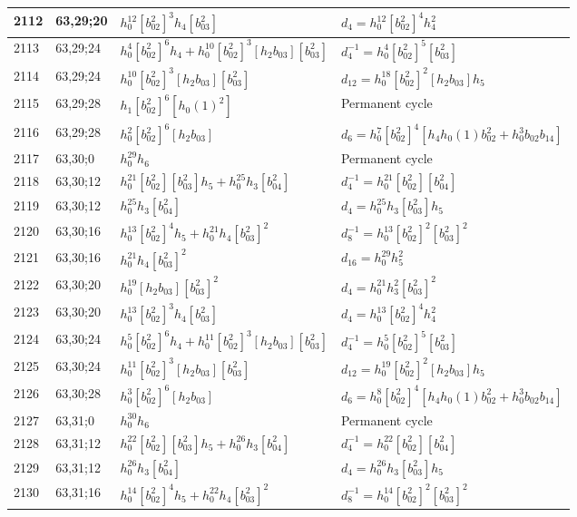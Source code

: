\documentclass{article}
\begin{document}
\begin{longtable}{|l|l|>{\raggedright\arraybackslash}p{6cm}|>{\raggedright\arraybackslash}p{6cm}|}
2112 & 63,29;20 & $h_0^{12}[b_{02}^2]^3h_4[b_{03}^2]$ &$d_{4}=h_0^{12}[b_{02}^2]^4h_4^2$\\
\hline
2113 & 63,29;24 & $h_0^4[b_{02}^2]^6h_4 + h_0^{10}[b_{02}^2]^3[h_2b_{03}][b_{03}^2]$ & $d_{4}^{-1}=h_0^4[b_{02}^2]^5[b_{03}^2]$\\
2114 & 63,29;24 & $h_0^{10}[b_{02}^2]^3[h_2b_{03}][b_{03}^2]$ &$d_{12}=h_0^{18}[b_{02}^2]^2[h_2b_{03}]h_5$\\
\hline
2115 & 63,29;28 & $h_1[b_{02}^2]^6[h_0(1)^2]$ & Permanent cycle\\
2116 & 63,29;28 & $h_0^2[b_{02}^2]^6[h_2b_{03}]$ &$d_{6}=h_0^7[b_{02}^2]^4[h_4h_0(1)b_{02}^2 + h_0^3b_{02}b_{14}]$\\
\hline
2117 & 63,30;0 & $h_0^{29}h_6$ & Permanent cycle\\
\hline
2118 & 63,30;12 & $h_0^{21}[b_{02}^2][b_{03}^2]h_5 + h_0^{25}h_3[b_{04}^2]$ & $d_{4}^{-1}=h_0^{21}[b_{02}^2][b_{04}^2]$\\
2119 & 63,30;12 & $h_0^{25}h_3[b_{04}^2]$ &$d_{4}=h_0^{25}h_3[b_{03}^2]h_5$\\
\hline
2120 & 63,30;16 & $h_0^{13}[b_{02}^2]^4h_5 + h_0^{21}h_4[b_{03}^2]^2$ & $d_{8}^{-1}=h_0^{13}[b_{02}^2]^2[b_{03}^2]^2$\\
2121 & 63,30;16 & $h_0^{21}h_4[b_{03}^2]^2$ &$d_{16}=h_0^{29}h_5^2$\\
\hline
2122 & 63,30;20 & $h_0^{19}[h_2b_{03}][b_{03}^2]^2$ &$d_{4}=h_0^{21}h_3^2[b_{03}^2]^2$\\
2123 & 63,30;20 & $h_0^{13}[b_{02}^2]^3h_4[b_{03}^2]$ &$d_{4}=h_0^{13}[b_{02}^2]^4h_4^2$\\
\hline
2124 & 63,30;24 & $h_0^5[b_{02}^2]^6h_4 + h_0^{11}[b_{02}^2]^3[h_2b_{03}][b_{03}^2]$ & $d_{4}^{-1}=h_0^5[b_{02}^2]^5[b_{03}^2]$\\
2125 & 63,30;24 & $h_0^{11}[b_{02}^2]^3[h_2b_{03}][b_{03}^2]$ &$d_{12}=h_0^{19}[b_{02}^2]^2[h_2b_{03}]h_5$\\
\hline
2126 & 63,30;28 & $h_0^3[b_{02}^2]^6[h_2b_{03}]$ &$d_{6}=h_0^8[b_{02}^2]^4[h_4h_0(1)b_{02}^2 + h_0^3b_{02}b_{14}]$\\
\hline
2127 & 63,31;0 & $h_0^{30}h_6$ & Permanent cycle\\
\hline
2128 & 63,31;12 & $h_0^{22}[b_{02}^2][b_{03}^2]h_5 + h_0^{26}h_3[b_{04}^2]$ & $d_{4}^{-1}=h_0^{22}[b_{02}^2][b_{04}^2]$\\
2129 & 63,31;12 & $h_0^{26}h_3[b_{04}^2]$ &$d_{4}=h_0^{26}h_3[b_{03}^2]h_5$\\
\hline
2130 & 63,31;16 & $h_0^{14}[b_{02}^2]^4h_5 + h_0^{22}h_4[b_{03}^2]^2$ & $d_{8}^{-1}=h_0^{14}[b_{02}^2]^2[b_{03}^2]^2$\\

\end{longtable}
\end{document}

